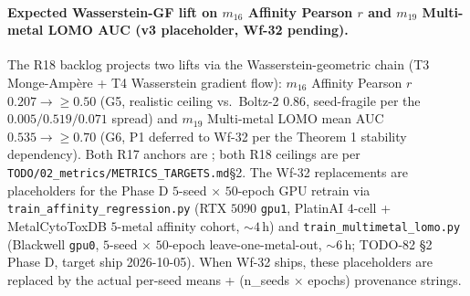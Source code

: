 \paragraph{Expected Wasserstein-GF lift on $m_{16}$ Affinity
Pearson $r$ and $m_{19}$ Multi-metal LOMO AUC (v3 placeholder,
Wf-32 pending).}
The R18 backlog projects two lifts via the Wasserstein-geometric
chain (T3 Monge-Amp\`ere + T4 Wasserstein gradient flow):
$m_{16}$ Affinity Pearson $r$ $0.207 \to \geq 0.50$ (G5,
realistic ceiling vs.\ Boltz-2 $0.86$, seed-fragile per the
$0.005 / 0.519 / 0.071$ spread) and $m_{19}$ Multi-metal LOMO
mean AUC $0.535 \to \geq 0.70$ (G6, P1 deferred to Wf-32 per
the Theorem 1 stability dependency).  Both R17 anchors are
\MEASURED{}; both R18 ceilings are \PROJECTED{} per
\texttt{TODO/02\_metrics/METRICS\_TARGETS.md}\S2.  The Wf-32
replacements are  placeholders for the
Phase D $5$-seed $\times$ $50$-epoch GPU retrain via
\texttt{train\_affinity\_regression.py} (RTX $5090$ \texttt{gpu1},
PlatinAI $4$-cell + MetalCytoToxDB $5$-metal affinity cohort,
$\sim 4$\,h) and \texttt{train\_multimetal\_lomo.py} (Blackwell
\texttt{gpu0}, $5$-seed $\times$ $50$-epoch leave-one-metal-out,
$\sim 6$\,h; TODO-82 \S2 Phase D, target ship 2026-10-05).
When Wf-32 ships, these placeholders are replaced by the actual
per-seed means + (n\_seeds $\times$ epochs) provenance strings.